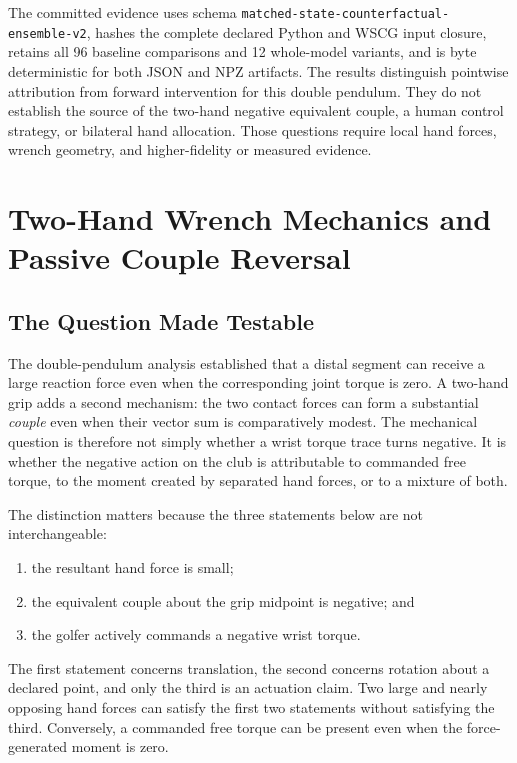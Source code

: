 \documentclass[
  letterpaper,
]{report}
\providecommand{\tightlist}{%
  \setlength{\itemsep}{0pt}\setlength{\parskip}{0pt}}
\begin{document}
The committed evidence uses schema
\texttt{matched-state-counterfactual-ensemble-v2}, hashes the complete
declared Python and WSCG input closure, retains all 96 baseline
comparisons and 12 whole-model variants, and is byte deterministic for
both JSON and NPZ artifacts. The results distinguish pointwise
attribution from forward intervention for this double pendulum. They do
not establish the source of the two-hand negative equivalent couple, a
human control strategy, or bilateral hand allocation. Those questions
require local hand forces, wrench geometry, and higher-fidelity or
measured evidence.

\chapter{Two-Hand Wrench Mechanics and Passive Couple
Reversal}\label{sec-two-hand-wrench}

\section{The Question Made Testable}\label{sec-two-hand-question}

The double-pendulum analysis established that a distal segment can
receive a large reaction force even when the corresponding joint torque
is zero. A two-hand grip adds a second mechanism: the two contact forces
can form a substantial \emph{couple} even when their vector sum is
comparatively modest. The mechanical question is therefore not simply
whether a wrist torque trace turns negative. It is whether the negative
action on the club is attributable to commanded free torque, to the
moment created by separated hand forces, or to a mixture of both.

The distinction matters because the three statements below are not
interchangeable:

\begin{enumerate}
\def\labelenumi{\arabic{enumi}.}
\tightlist
\item
  the resultant hand force is small;
\item
  the equivalent couple about the grip midpoint is negative; and
\item
  the golfer actively commands a negative wrist torque.
\end{enumerate}

The first statement concerns translation, the second concerns rotation
about a declared point, and only the third is an actuation claim. Two
large and nearly opposing hand forces can satisfy the first two
statements without satisfying the third. Conversely, a commanded free
torque can be present even when the force-generated moment is zero.
\end{document}

